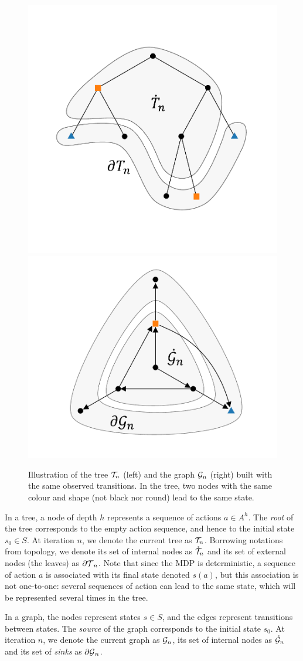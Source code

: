 \begin{figure}[tp]
	\centering
	\includegraphics[trim={1.8cm 2.2cm 1.9cm 2.7cm}, clip,width=0.46\linewidth]{img/gbop/tree_1}
	\hfill
	\includegraphics[trim={1.8cm 1.2cm 1.9cm 0.8cm}, clip,width=0.46\linewidth]{img/gbop/graph_1}
	\caption{Illustration of the tree $\mathcal{T}_n$ (left) and the graph $\mathcal{G}_n$ (right) built with the same observed transitions. In the tree, two nodes with the same colour and shape (not black nor round) lead to the same state.}
	\label{fig:structures}
\end{figure}

In a tree, a node of depth $h$ represents a sequence of actions $a\in A^h$. The \textit{root} of the tree corresponds to the empty action sequence, and hence to the initial state $s_0\in S$. At iteration $n$, we denote the current tree as $\mathcal{T}_n$. Borrowing notations from topology, we denote its set of internal nodes as $\mathring{\mathcal{T}}_n$ and its set of external nodes (the leaves) as ${\partial \mathcal{T}}_n$. Note that since the MDP is deterministic, a sequence of action $a$ is associated with its final state denoted $s(a)$, but this association is not one-to-one: several sequences of action can lead to the same state, which will be represented several times in the tree.

In a graph, the nodes represent states $s\in S$, and the edges represent transitions between states. The \textit{source} of the graph corresponds to the initial state $s_0$. At iteration $n$, we denote the current graph as $\mathcal{G}_n$, its set of internal nodes as $\mathring{\mathcal{G}}_n$ and its set of \textit{sinks} as ${\partial \mathcal{G}}_n$.

